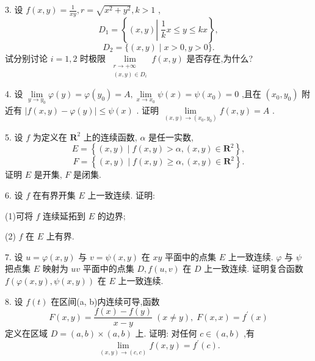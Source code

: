 3. 设 \(f\left( {x,y}\right)  = \frac{1}{xy},r = \sqrt{{x}^{2} + {y}^{2}},k > 1\) ,
\[
{D}_{1} = \left\{  {\left( {x,y}\right) \left| {\;\frac{1}{k}x \leq  y \leq  {kx}}\right. }\right\}  ,
\]
\[
{D}_{2} = \{ \left( {x,y}\right)  \mid  x > 0,y > 0\} .
\]
试分别讨论 \(i = 1,2\) 时极限 \(\mathop{\lim }\limits_{\substack{{r \rightarrow   + \infty } \\  {\left( {x,y}\right)  \in  {D}_{i}} }}f\left( {x,y}\right)\) 是否存在,为什么?

4. 设 \(\mathop{\lim }\limits_{{y \rightarrow  {y}_{0}}}\varphi \left( y\right)  = \varphi \left( {y}_{0}\right)  = A,\mathop{\lim }\limits_{{x \rightarrow  {x}_{0}}}\psi \left( x\right)  = \psi \left( {x}_{0}\right)  = 0\) ,且在 \(\left( {{x}_{0},{y}_{0}}\right)\) 附近有 \(\left| {f\left( {x,y}\right)  - \varphi \left( y\right) }\right|  \leq  \psi \left( x\right)\) . 证明 \(\mathop{\lim }\limits_{{\left( {x,y}\right)  \rightarrow  \left( {{x}_{0},{y}_{0}}\right) }}f\left( {x,y}\right)  = A\) .

5. 设 \(f\) 为定义在 \({\mathbf{R}}^{2}\) 上的连续函数, \(\alpha\) 是任一实数,
\[
E = \left\{  {\left( {x,y}\right)  \mid  f\left( {x,y}\right)  > \alpha ,\left( {x,y}\right)  \in  {\mathbf{R}}^{2}}\right\}  ,
\]
\[
F = \left\{  {\left( {x,y}\right)  \mid  f\left( {x,y}\right)  \geq  \alpha ,\left( {x,y}\right)  \in  {\mathbf{R}}^{2}}\right\}  .
\]
证明 \(E\) 是开集, \(F\) 是闭集.

6. 设 \(f\) 在有界开集 \(E\) 上一致连续. 证明:

(1)可将 \(f\) 连续延拓到 \(E\) 的边界;

(2) \(f\) 在 \(E\) 上有界.

7. 设 \(u = \varphi \left( {x,y}\right)\) 与 \(v = \psi \left( {x,y}\right)\) 在 \({xy}\) 平面中的点集 \(E\) 上一致连续. \(\varphi\) 与 \(\psi\) 把点集 \(E\) 映射为 \({uv}\) 平面中的点集 \(D,f\left( {u,v}\right)\) 在 \(D\) 上一致连续. 证明复合函数 \(f\left( {\varphi \left( {x,y}\right) ,\psi \left( {x,y}\right) }\right)\) 在 \(E\) 上一致连续.

8. 设 \(f\left( t\right)\) 在区间(a, b)内连续可导,函数
\[
F\left( {x,y}\right)  = \frac{f\left( x\right)  - f\left( y\right) }{x - y}\;\left( {x \neq  y}\right) ,\;F\left( {x,x}\right)  = {f}^{\prime }\left( x\right)
\]
定义在区域 \(D = \left( {a,b}\right)  \times  \left( {a,b}\right)\) 上. 证明: 对任何 \(c \in  \left( {a,b}\right)\) ,有
\[
\mathop{\lim }\limits_{{\left( {x,y}\right)  \rightarrow  \left( {c,c}\right) }}f\left( {x,y}\right)  = {f}^{\prime }\left( c\right) .
\]
